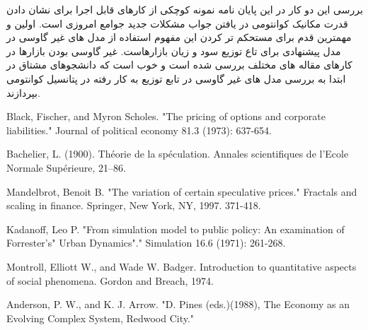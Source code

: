 \documentclass[a4paper,titlepage,12pt,fleqn,oneside]{report}
\begin{document}
بررسی این دو کار در این پایان نامه نمونه کوچکی از کارهای قابل اجرا برای نشان دادن قدرت مکانیک کوانتومی در یافتن جواب مشکلات جدید جوامع امروزی است. اولین و مهمترین قدم برای مستحکم تر کردن این مفهوم استفاده از مدل های غیر گاوسی در مدل پیشنهادی برای تاع توزیع سود و زیان بازارهاست. غیر گاوسی بودن بازارها در کارهای مقاله های مختلف بررسی شده است و خوب است که دانشجوهای مشتاق در ابتدا به بررسی مدل های غیر گاوسی در تابع توزیع به کار رفته در پتانسیل کوانتومی بپردازند.
 

\begin{thebibliography}{99}

\begin{LTRitems}
	Black, Fischer, and Myron Scholes. "The pricing of options and corporate liabilities." Journal of political economy 81.3 (1973): 637-654.
\end{LTRitems}	
	
\begin{LTRitems}
Bachelier, L. (1900). Théorie de la spéculation. Annales scientifiques de l’Ecole
Normale Supérieure, 21–86.
\end{LTRitems}

\begin{LTRitems}
	Mandelbrot, Benoit B. "The variation of certain speculative prices." Fractals and scaling in finance. Springer, New York, NY, 1997. 371-418.
\end{LTRitems}

\begin{LTRitems}
	Kadanoff, Leo P. "From simulation model to public policy: An examination of Forrester's" Urban Dynamics"." Simulation 16.6 (1971): 261-268.
\end{LTRitems}

\begin{LTRitems}
	Montroll, Elliott W., and Wade W. Badger. Introduction to quantitative aspects of social phenomena. Gordon and Breach, 1974.
\end{LTRitems}

\begin{LTRitems}
	Anderson, P. W., and K. J. Arrow. "D. Pines (eds.)(1988), The Economy as an Evolving Complex System, Redwood City."
\end{LTRitems}


\end{thebibliography}
\end{document}
